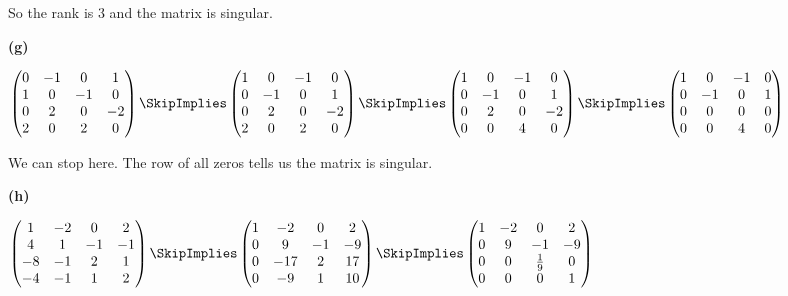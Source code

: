 \documentclass[oneside,12pt]{amsart}
\begin{document}
\bigskip

So the rank is 3 and the matrix is singular.


\bigskip

\textbf{(g)}

$
\begin{pmatrix}
0 & -1 & 0 & 1 \\
1 & 0 & -1 & 0 \\
0 & 2 & 0 & -2 \\
2 & 0 & 2 & 0
\end{pmatrix}
\SkipImplies
\begin{pmatrix}
1 & 0 & -1 & 0 \\
0 & -1 & 0 & 1 \\
0 & 2 & 0 & -2 \\
2 & 0 & 2 & 0
\end{pmatrix}
\SkipImplies
\begin{pmatrix}
1 & 0 & -1 & 0 \\
0 & -1 & 0 & 1 \\
0 & 2 & 0 & -2 \\
0 & 0 & 4 & 0
\end{pmatrix}
\SkipImplies
\begin{pmatrix}
1 & 0 & -1 & 0 \\
0 & -1 & 0 & 1 \\
0 & 0 & 0 & 0 \\
0 & 0 & 4 & 0
\end{pmatrix}
$

\bigskip

We can stop here. The row of all zeros tells us the matrix is singular.

\bigskip

\textbf{(h)}

$
\begin{pmatrix}
1 & -2 & 0 & 2 \\
4 & 1 & -1 & -1 \\
-8 & -1 & 2 & 1 \\
-4 & -1 & 1 & 2
\end{pmatrix}
\SkipImplies
\begin{pmatrix}
1 & -2 & 0 & 2 \\
0 & 9 & -1 & -9 \\
0 & -17 & 2 & 17 \\
0 & -9 & 1 & 10
\end{pmatrix}
\SkipImplies
\begin{pmatrix}
1 & -2 & 0 & 2 \\
0 & 9 & -1 & -9 \\
0 & 0 & \frac{1}{9} & 0 \\
0 & 0 & 0 & 1
\end{pmatrix}
$
\end{document}
